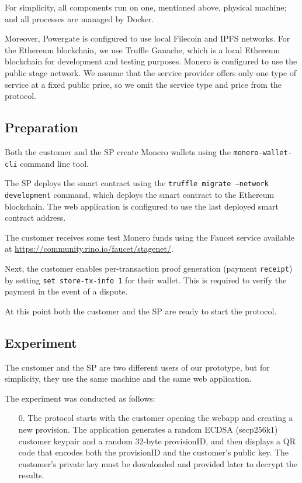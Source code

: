 \documentclass[pdftex,twocolumn,epjc3]{svjour3}
\begin{document}
{For simplicity, all components run on one, mentioned above, physical machine; and all processes are managed by Docker. 

Moreover, Powergate is configured to use local Filecoin and IPFS networks.
For the Ethereum blockchain, we use Truffle Ganache, which is a local Ethereum blockchain for development and testing purposes. 
Monero is configured to use the public stage network.
We assume that the service provider offers only one type of service at a fixed public price, so we omit the service type and price from the protocol.

\subsection*{Preparation}

Both the customer and the SP create Monero wallets using the \texttt{monero-wallet-cli} command line tool.

The SP deploys the smart contract using the \texttt{truffle migrate --network development} command, which deploys the smart contract to the Ethereum blockchain. The web application is configured to use the last deployed smart contract address.

The customer receives some test Monero funds using the Faucet service available at \url{https://community.rino.io/faucet/stagenet/}.

Next, the customer enables per-transaction proof generation (payment \texttt{receipt}) by setting \texttt{set store-tx-info 1} for their wallet. This is required to verify the payment in the event of a dispute.

At this point both the customer and the SP are ready to start the protocol.

\subsection*{Experiment}

The customer and the SP are two different users of our prototype, but for simplicity, they use the same machine and the same web application.

The experiment was conducted as follows:

\begin{enumerate}
  \setcounter{enumi}{0}
  \item[0.] The protocol starts with the customer opening the webapp and creating a new provision.
The application generates a random ECDSA (secp256k1) customer keypair and a random 32-byte provisionID, and then displays a QR code that encodes both the provisionID and the customer's public key. 
The customer's private key must be downloaded and provided later to decrypt the results.


\end{enumerate}}
\end{document}
